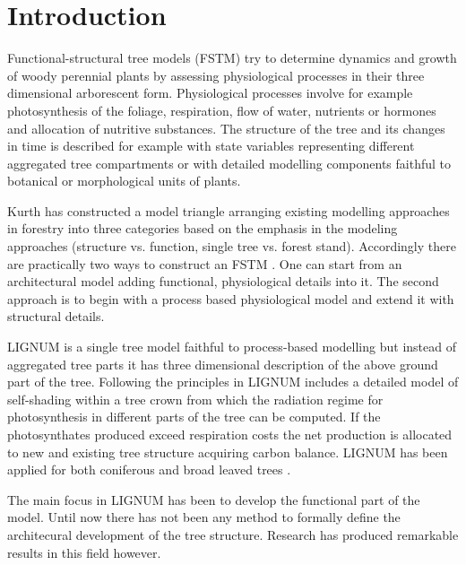 \section{Introduction}
Functional-structural tree models (FSTM) try to determine dynamics and
growth of woody perennial  plants by assessing physiological processes
in their three  dimensional arborescent form.  Physiological processes
involve for  example photosynthesis of the  foliage, respiration, flow
of  water,   nutrients  or   hormones  and  allocation   of  nutritive
substances.   The structure of  the tree  and its  changes in  time is
described  for  example with  state  variables representing  different
aggregated  tree compartments  or with  detailed  modelling components
faithful to botanical or morphological units of plants.

Kurth  has constructed  a model  triangle  \citep{kurth:94b} arranging
existing modelling approaches in  forestry into three categories based
on the  emphasis in the modeling approaches  (structure vs.  function,
single tree vs.  forest stand).  Accordingly there are practically two
ways to construct an FSTM  \citep{sievanen:00}.  One can start from an
architectural  model   \citep{jaeger:92,kurth:94}  adding  functional,
physiological details into it.  The second approach is to begin with a
process  based  physiological  model  \citep{makela:86,  landsberg:86,
  sievanen:93} and extend it with structural details.

LIGNUM  is  a  single  tree  model  \citep{perttunen:96}  faithful  to
process-based  modelling \citep[see  e.g.][]{nikinmaa:92, sievanen:93,
  makela:97-1}  but instead  of  aggregated tree  parts  it has  three
dimensional  description  of  the  above  ground  part  of  the  tree.
Following the principles in \citet{hari:82} LIGNUM includes a detailed
model  of  self-shading   within  a  tree  crown  \citep{perttunen:96,
  perttunen:01} from which the  radiation regime for photosynthesis in
different parts  of the tree  can be computed.  If  the photosynthates
produced exceed  respiration costs the net production  is allocated to
new and existing tree  structure acquiring carbon balance.  LIGNUM has
been applied for  both coniferous \citep{perttunen:96,lo:99} and broad
leaved trees \citep{perttunen:01}.

The main  focus in LIGNUM has  been to develop the  functional part of
the model.  Until now there has not been any method to formally define
the  architecural development  of  the tree  structure.  Research  has
produced  remarkable  results  in  this  field  however.   

